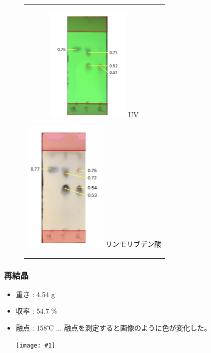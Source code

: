 \documentclass[a4paper,papersize,dvipdfmx]{jsarticle}
\newcommand{\pict}[2]{\begin{center} \texttt{[image: \#1]} \end{center}}   %
\begin{document}
\begin{figure}[H]
\begin{center}
\begin{tabular}{c}

\begin{minipage}{0.22\hsize}
\begin{center}
\includegraphics[clip, width=4cm]{imgs3/tlc1.jpg}
\hspace{1.6cm} UV
\end{center}
\end{minipage}

\begin{minipage}{0.05\hsize}
        \hspace{2mm}
      \end{minipage}

\begin{minipage}{0.22\hsize}
\begin{center}
\includegraphics[clip, width=4cm]{imgs3/tlc2.jpg}
\hspace{1.6cm} リンモリブデン酸
\end{center}
\end{minipage}

\end{tabular}
\end{center}
\end{figure}

\subsubsection*{再結晶}
\begin{itemize}
\item 重さ : 4.54 g
\item 収率 : 54.7 $\%$
\item 融点 : 158℃  ... 融点を測定すると画像のように色が変化した。

\pict{imgs3/yuten.jpg}{3}


\end{itemize}
\end{document}
